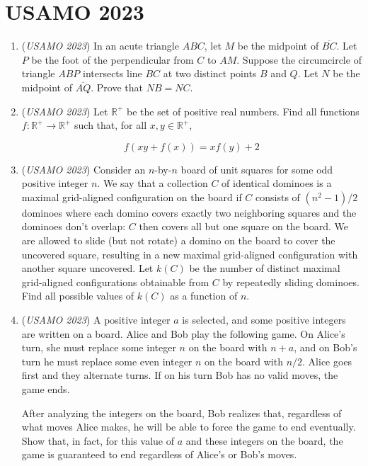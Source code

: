 \section{USAMO 2023}
        \begin{enumerate}
        	\item (\textit{USAMO 2023}) In an acute triangle $ABC$, let $M$ be the midpoint of $\overline{BC}$. Let $P$ be the foot of the perpendicular from $C$ to $AM$. Suppose the circumcircle of triangle $ABP$ intersects line $BC$ at two distinct points $B$ and $Q$. Let $N$ be the midpoint of $\overline{AQ}$. Prove that $NB=NC$.


 

	\item (\textit{USAMO 2023}) Let $\mathbb{R}^{+}$ be the set of positive real numbers. Find all functions $f:\mathbb{R}^{+}\rightarrow\mathbb{R}^{+}$ such that, for all $x, y \in \mathbb{R}^{+}$,

 \[f(xy + f(x)) = xf(y) + 2\]


	\item (\textit{USAMO 2023}) Consider an $n$-by-$n$ board of unit squares for some odd positive integer $n$. We say that a collection $C$ of identical dominoes is a maximal grid-aligned configuration on the board if $C$ consists of $(n^2-1)/2$ dominoes where each domino covers exactly two neighboring squares and the dominoes don't overlap: $C$ then covers all but one square on the board. We are allowed to slide (but not rotate) a domino on the board to cover the uncovered square, resulting in a new maximal grid-aligned configuration with another square uncovered. Let $k(C)$ be the number of distinct maximal grid-aligned configurations obtainable from $C$ by repeatedly sliding dominoes. Find all possible values of $k(C)$ as a function of $n$.


 

	\item (\textit{USAMO 2023}) A positive integer $a$ is selected, and some positive integers are written on a board. Alice and Bob play the following game. On Alice's turn, she must replace some integer $n$ on the board with $n+a$, and on Bob's turn he must replace some even integer $n$ on the board with $n/2$. Alice goes first and they alternate turns. If on his turn Bob has no valid moves, the game ends.


 After analyzing the integers on the board, Bob realizes that, regardless of what moves Alice makes, he will be able to force the game to end eventually. Show that, in fact, for this value of $a$ and these integers on the board, the game is guaranteed to end regardless of Alice's or Bob's moves.



\end{enumerate}
